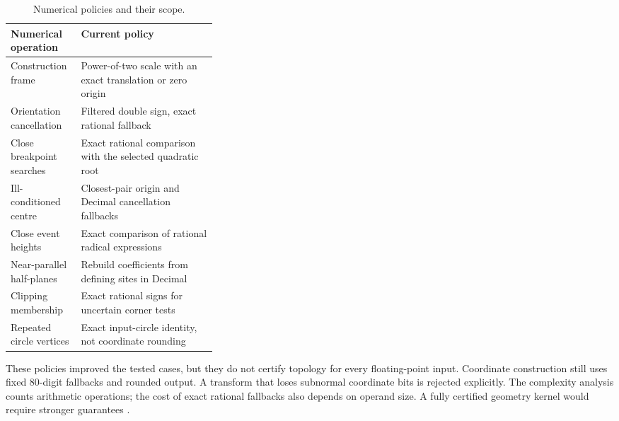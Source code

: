 \begin{table}[!htbp]
\centering
\caption{Numerical policies and their scope.}
\label{tab:3}
\begin{tabularx}{\linewidth}{@{}p{0.34\linewidth}X@{}}
\toprule
\textbf{Numerical operation} & \textbf{Current policy} \\
\midrule
Construction frame & Power-of-two scale with an exact translation or zero origin \\
Orientation cancellation & Filtered double sign, exact rational fallback \\
Close breakpoint searches & Exact rational comparison with the selected quadratic root \\
Ill-conditioned centre & Closest-pair origin and Decimal cancellation fallbacks \\
Close event heights & Exact comparison of rational radical expressions \\
Near-parallel half-planes & Rebuild coefficients from defining sites in Decimal \\
Clipping membership & Exact rational signs for uncertain corner tests \\
Repeated circle vertices & Exact input-circle identity, not coordinate rounding \\
\bottomrule
\end{tabularx}
\end{table}

These policies improved the tested cases, but they do not certify topology for every floating-point input. Coordinate construction still uses fixed 80-digit fallbacks and rounded output. A transform that loses subnormal coordinate bits is rejected explicitly. The complexity analysis counts arithmetic operations; the cost of exact rational fallbacks also depends on operand size. A fully certified geometry kernel would require stronger guarantees \cite{shewchuk1997}.
